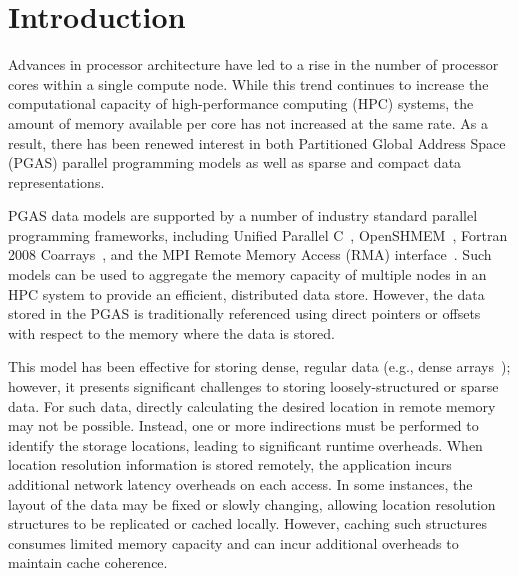 \section{Introduction}

Advances in processor architecture have led to a rise in the number of
processor cores within a single compute node.  While this trend continues to
increase the computational capacity of high-performance computing (HPC)
systems, the amount of memory available per core has not increased at the same
rate.  As a result, there has been renewed interest in both Partitioned Global
Address Space (PGAS) parallel programming models as well as sparse and compact
data representations.

PGAS data models are supported by a number of industry standard parallel
programming frameworks, including Unified Parallel C~\cite{upc-13-spec},
OpenSHMEM~\cite{openshmem-1.3}, Fortran 2008 Coarrays~\cite{reid:08}, and the MPI
Remote Memory Access (RMA) interface~\cite{mpi-forum:15}.  Such models can be used
to aggregate the memory capacity of multiple nodes in an HPC system to provide
an efficient, distributed data store.  However, the data stored in the PGAS is
traditionally referenced using direct pointers or offsets with respect to the
memory where the data is stored.

This model has been effective for storing dense, regular data (e.g., dense
arrays~\cite{ga}); however, it presents significant challenges to
storing loosely-structured or sparse data.  For such data, directly calculating the
desired location in remote memory may not be possible.  Instead, one or more
indirections must be performed to identify the storage locations, leading to
significant runtime overheads.  When location resolution information is stored
remotely, the application incurs additional network latency overheads on each
access.  In some instances, the layout of the data may be fixed or slowly
changing, allowing location resolution structures to be replicated or cached
locally.  However, caching such structures consumes limited memory capacity and
can incur additional overheads to maintain cache coherence.


